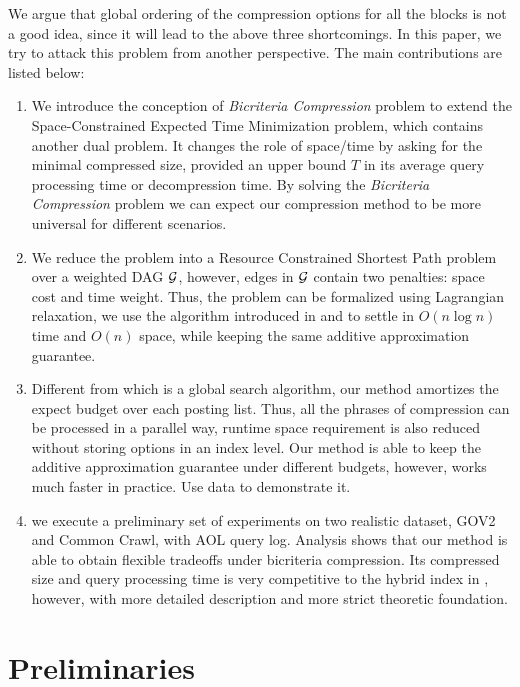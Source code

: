 \documentclass{sig-alternate-05-2015}
\begin{document}
We argue that global ordering of the compression options for all the blocks is not a good idea, since it will lead to the above three shortcomings.
In this paper, we try to attack this problem from another perspective.
The main contributions are listed below:
\begin{enumerate}
	\item We introduce the conception of \textit{Bicriteria Compression} problem \cite{farruggia2014bicriteria} to extend the Space-Constrained Expected Time Minimization problem, which contains another dual problem.
	It changes the role of space/time by asking for the minimal compressed size, provided an upper bound $ T $ in its average query processing time or decompression time.
	By solving the \textit{Bicriteria Compression} problem  we can expect our compression method to be more universal for different scenarios.
	\item We reduce the problem into a Resource Constrained Shortest Path problem \cite{mehlhorn2000resource} over a weighted DAG $ \cal G $, however, edges in $ \cal G $ contain two penalties: space cost and time weight.
	Thus, the problem can be formalized using Lagrangian relaxation, we use the algorithm introduced in \cite{farruggia2014bicriteria} and \cite{handler1980dual} to settle in $ O(n\log n) $ time and $ O(n) $ space, while keeping the same additive approximation guarantee.
	\item Different from \cite{ottaviano2015optimal} which is a global search algorithm, our method amortizes the expect budget over each posting list.
	Thus, all the phrases of compression can be processed in a parallel way, runtime space requirement is also reduced without storing options in an index level.
	Our method is able to keep the additive approximation guarantee under different budgets, however, works much faster in practice.	
	{\color{red} Use data to demonstrate it}.
	\item we execute a preliminary set of experiments on two realistic dataset, GOV2 and Common Crawl, with AOL query log.
	Analysis shows that our method is able to obtain flexible tradeoffs under bicriteria compression.
	Its compressed size and query processing time is very competitive to the hybrid index in \cite{ottaviano2015optimal}, however, with more detailed description and more strict theoretic foundation.
\end{enumerate}

\section{Preliminaries}\label{sec: preliminaries}
\end{document}
